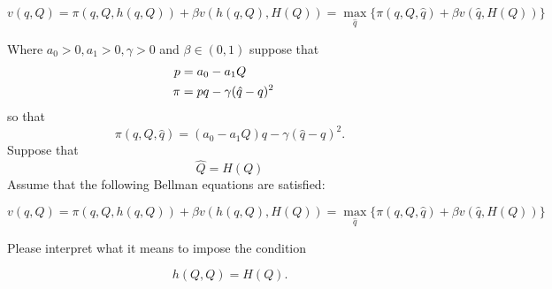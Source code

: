 \documentclass{article} %
\begin{document}
$$ v(q, Q) = \pi(q,Q, h(q, Q) ) + \beta v\left(h(q,Q), H(Q)\right) = \max_{\hat q} \{\pi(q, Q, \hat q) + \beta v(\hat q, H(Q) )   \} $$

\medskip

 \quad  Where $a_0 >0, a_1> 0, \gamma > 0$ and $\beta \in (0,1)$ suppose that
\begin{align*} p & = a_0 - a_1 Q \cr
           \pi &  = p q - \gamma(\hat q - q)^2 \end{align*}
so that
$$ \pi(q, Q, \hat q) = (a_0 - a_1 Q) q- \gamma (\hat q - q)^2 .$$
Suppose that
$$ \hat Q  = H(Q)  $$
Assume that the following Bellman equations are satisfied: %

$$ v(q, Q) = \pi(q,Q, h(q,Q)) + \beta v\left(h(q,Q), H(Q)\right) = \max_{\hat q} \{\pi(q, Q, \hat q) + \beta v(\hat q, H(Q) )   \} $$

\noindent Please interpret what it means to impose the condition

$$ h(Q, Q) = H(Q) .$$
\end{document}
